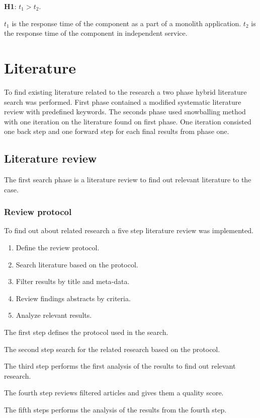 \textbf{H1}\label{H1}: $t_1>t_2$.

$t_1$ is the response time of the component as a part of a monolith application. 
$t_2$ is the response time of the component in independent service.

\section{Literature}
To find existing literature related to the research a two phase hybrid literature search was performed.
First phase contained a modified systematic literature review with predefined keywords.
The seconds phase used snowballing method with one iteration on the literature found on first phase.
One iteration consisted one back step and one forward step for each final results from phase one.

\subsection{Literature review}
The first search phase is a literature review to find out relevant literature to the case.

\subsubsection{Review protocol}
To find out about related research a five step literature review was implemented.

\begin{enumerate}
    \item Define the review protocol.
    \item Search literature based on the protocol.
    \item Filter results by title and meta-data.
    \item Review findings abstracts by criteria.
    \item Analyze relevant results.
\end{enumerate}

The first step defines the protocol used in the search.

The second step search for the related research based on the protocol.

The third step performs the first analysis of the results to find out relevant research.

The fourth step reviews filtered articles and gives them a quality score.

The fifth steps performs the analysis of the results from the fourth step.

